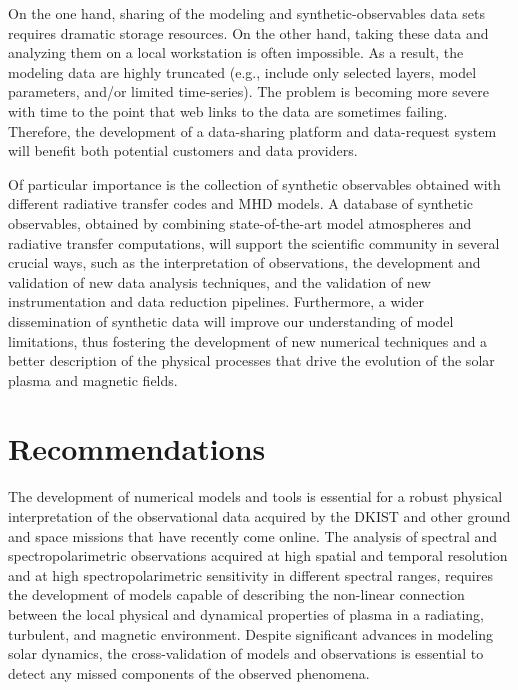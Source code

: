 \documentclass[]{article}
\newcommand{\SC}{\bf \color{red}}
\begin{document}
On the one hand, sharing of the modeling and synthetic-observables data sets requires dramatic storage resources. On the other hand, taking these data and analyzing them on a local workstation is often impossible. As a result, the modeling data are highly truncated (e.g., include only selected layers, model parameters, and/or limited time-series). 
The problem is becoming more severe with time to the point that web links to the data are sometimes failing. Therefore, the development of a data-sharing platform and data-request system will benefit both potential customers and data providers. 

 Of particular importance is the collection of synthetic observables obtained with different radiative transfer codes and MHD models. 
 A database of synthetic observables, obtained by combining state-of-the-art model atmospheres and radiative transfer computations, will support the scientific community in several crucial ways, such as the interpretation of observations, the development and validation of new data analysis techniques, and the validation of new instrumentation and data reduction pipelines. Furthermore, a wider dissemination of synthetic data will improve our understanding of model limitations, thus fostering the development of new numerical techniques and a better description of the physical processes that drive the evolution of the solar plasma and magnetic fields.

\section{Recommendations}

 The development of numerical models and tools is essential for a robust physical interpretation of the observational data acquired by the DKIST and other ground and space missions that have recently come online. The analysis of spectral and spectropolarimetric observations acquired at high spatial and temporal resolution and at high spectropolarimetric sensitivity in different spectral ranges, requires the development of models capable of describing the non-linear connection between the local physical and dynamical properties of plasma in a radiating, turbulent, and magnetic environment. Despite significant advances in modeling solar dynamics, the cross-validation of models and observations is essential to detect any missed components of the observed phenomena.
\end{document}
